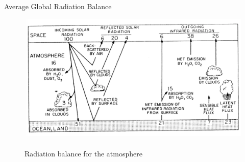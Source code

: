 
\begin{frame}{Average Global Radiation Balance}
\begin{figure}
	\includegraphics[width=\textwidth]{fig20.png}
	\centering \tiny~\\Radiation balance for the atmosphere
\end{figure}
\end{frame}


